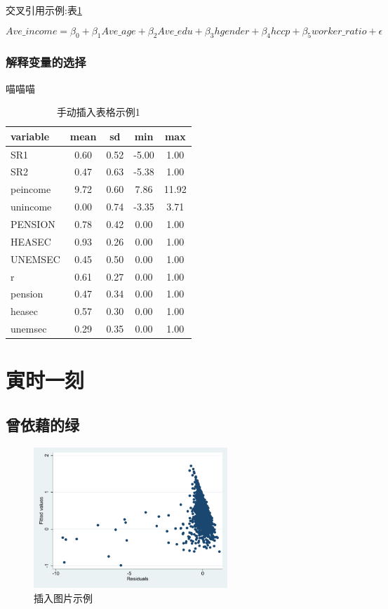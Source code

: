 \documentclass[a4paper,12pt]{report}
\begin{document}
交叉引用示例:表\ref{hhh}

\[
Ave\_income = \beta_0 + \beta_{1}Ave\_age + \beta_{2}Ave\_edu + \beta_{3}hgender + \beta_{4}hccp + \beta_{5}worker\_ratio + \epsilon
\]


\subsection{解释变量的选择}
喵喵喵
\begin{table}
    \caption{手动插入表格示例1}
    \centering
    \begin{tabular}{lcccc}
        \toprule[1.5pt]
        variable & mean & sd & min & max \\ 
        \midrule[1.0pt]
        SR1 & 0.60 & 0.52 & -5.00 & 1.00 \\ 
        SR2 & 0.47 & 0.63 & -5.38 & 1.00 \\ 
        peincome & 9.72 & 0.60 & 7.86 & 11.92 \\ 
        unincome & 0.00 & 0.74 & -3.35 & 3.71 \\ 
        PENSION & 0.78 & 0.42 & 0.00 & 1.00 \\ 
        HEASEC & 0.93 & 0.26 & 0.00 & 1.00 \\ 
        UNEMSEC & 0.45 & 0.50 & 0.00 & 1.00 \\ 
        r & 0.61 & 0.27 & 0.00 & 1.00 \\ 
        pension & 0.47 & 0.34 & 0.00 & 1.00 \\ 
        heasec & 0.57 & 0.30 & 0.00 & 1.00 \\ 
        unemsec & 0.29 & 0.35 & 0.00 & 1.00 \\ 
        \bottomrule[1.5pt]
    \end{tabular}
    \label{hhh}
\end{table}




\chapter{寅时一刻}
\section{曾依藉的绿}
\begin{figure}[H]
    \centering
    \includegraphics[width=0.65\textwidth]{figure/cancha.pdf}
    \caption{插入图片示例}
\end{figure}
\end{document}
